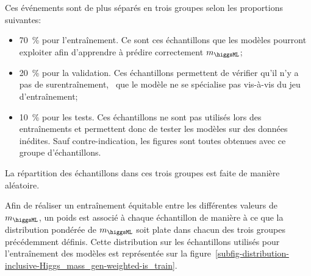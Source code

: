 \par
Ces événements sont de plus séparés en trois groupes selon les proportions suivantes:
\begin{itemize}
\item \SI{70}{\%} pour l'entraînement. Ce sont ces échantillons que les modèles pourront exploiter afin d'apprendre à prédire correctement $m_{\higgsML}$;
\item \SI{20}{\%} pour la validation. Ces échantillons permettent de vérifier qu'il n'y a pas de surentraînement, \ie\ que le modèle ne se spécialise pas vis-à-vis du jeu d'entraînement;
\item \SI{10}{\%} pour les tests. Ces échantillons ne sont pas utilisés lors des entraînements et permettent donc de tester les modèles sur des données inédites. Sauf contre-indication, les figures sont toutes obtenues avec ce groupe d'échantillons.
\end{itemize}
La répartition des échantillons dans ces trois groupes est faite de manière aléatoire.
\par
Afin de réaliser un entraînement équitable entre les différentes valeurs de $m_{\higgsML}$, un poids est associé à chaque échantillon de manière à ce que la distribution pondérée de $m_{\higgsML}$ soit plate dans chacun des trois groupes précédemment définis.
Cette distribution sur les échantillons utilisés pour l'entraînement des modèles est représentée sur la figure~\ref{subfig-distribution-inclusive-Higgs_mass_gen-weighted-is_train}.
